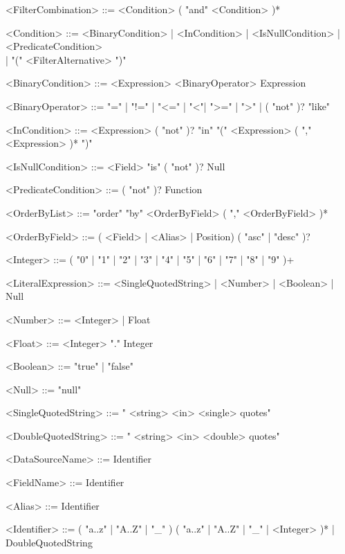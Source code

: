 \begin{grammar}
    <FilterCombination> ::= <Condition> ( "and" <Condition> )*

    <Condition> ::= <BinaryCondition> | <InCondition> | <IsNullCondition> | <PredicateCondition> \\
                 | "(" <FilterAlternative> ")"

    <BinaryCondition> ::= <Expression>  <BinaryOperator> Expression

    <BinaryOperator> ::= "=" | "!=" | "<=" | "<"| ">=" | ">" | ( "not" )? "like"

    <InCondition> ::= <Expression> ( "not" )? "in" "(" <Expression> ( "," <Expression> )* ")"

    <IsNullCondition> ::= <Field> "is" ( "not" )? Null

    <PredicateCondition> ::= ( "not" )? Function

    <OrderByList> ::= "order" "by" <OrderByField> ( "," <OrderByField> )*

    <OrderByField> ::= ( <Field> | <Alias> | Position) ( "asc" | "desc" )?

    <Integer> ::= ( "0" | "1" | "2" | "3" | "4" | "5" | "6" | "7" | "8" | "9" )+

    <LiteralExpression> ::= <SingleQuotedString> | <Number> | <Boolean> | Null

    <Number> ::= <Integer> | Float

    <Float> ::= <Integer> "." Integer

    <Boolean> ::= "true" | "false"

    <Null> ::= "null"

    <SingleQuotedString> ::= " <string>  <in>  <single> quotes"

    <DoubleQuotedString> ::= " <string>  <in>  <double> quotes"

    <DataSourceName> ::= Identifier

    <FieldName> ::= Identifier

    <Alias> ::= Identifier

    <Identifier> ::= ( "a..z" | "A..Z" | "_" ) ( "a..z" | "A..Z" | "_" | <Integer> )* | DoubleQuotedString

\end{grammar}